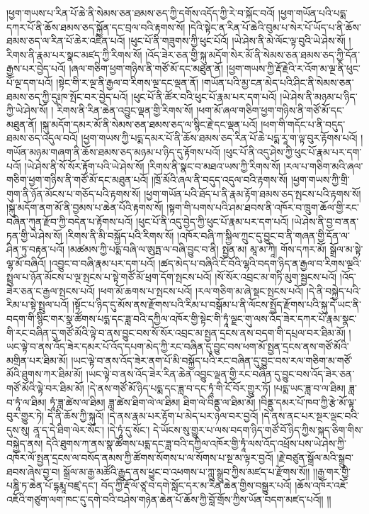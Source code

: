 །ཕྱག་གཡས་པ་རིན་པོ་ཆེ་ནི་སེམས་ཅན་ཐམས་ཅད་ཀྱི་དགོས་འདོད་ཀྱི་རེ་བ་སྐོང་བའོ། །ཕྱག་གཡོན་པའི་པདྨ་དཀར་པོ་ནི་ཆོས་ཐམས་ཅད་སྐྱོན་དང་བྲལ་བའི་རྟགས་སོ། །དེའི་སྟེང་ན་རིན་པོ་ཆེའི་བུམ་པ་སེར་པོ་ཡོད་པ་ནི་ཆོས་ཐམས་ཅད་ལ་རིན་པོ་ཆེར་འཛིན་པའོ། །ཕུང་པོ་ནི་གཟུགས་ཀྱི་ཕུང་པོའོ། །ཡེ་ཤེས་ནི་མེ་ལོང་ལྟ་བུའི་ཡེ་ཤེས་སོ། །རིགས་ནི་རྣམ་པར་སྣང་མཛད་ཀྱི་རིགས་སོ། །འོད་ཟེར་ཅན་གྱི་སྐུ་མདོག་སེར་མོ་ནི་སེམས་ཅན་ཐམས་ཅད་ཀྱི་དོན་རྒྱས་པར་བྱེད་པའོ། །ཞལ་གཅིག་ཕྱག་གཉིས་ནི་གཙོ་མོ་དང་མཐུན་ནོ། །ཕྱག་གཡས་ཀྱི་རྡོ་རྗེའི་ར་འོག་མ་ལྔ་ནི་ཕུང་པོ་ལྔ་དག་པའོ། །སྟེང་གི་ར་ལྔ་ནི་རྒྱལ་བ་རིགས་ལྔ་དང་ལྡན་ནོ། །གཡོན་པའི་མྱ་ངན་མེད་པའི་ཤིང་ནི་སེམས་ཅན་ཐམས་ཅད་ཀྱི་དུཿཁ་སྤོང་བར་བྱེད་པའོ། །ཕུང་པོ་ནི་ཚོར་བའི་ཕུང་པོ་རྣམ་པར་དག་པའོ། །ཡེ་ཤེས་ནི་མཉམ་པ་ཉིད་ཀྱི་ཡེ་ཤེས་སོ། །
རིགས་ནི་རིན་ཆེན་འབྱུང་ལྡན་གྱི་རིགས་སོ། །ཕག་མོ་ཞལ་གཅིག་ཕྱག་གཉིས་ནི་གཙོ་མོ་དང་མཐུན་ནོ། །སྐུ་མདོག་དམར་མོ་ནི་སེམས་ཅན་ཐམས་ཅད་ལ་སྙིང་རྗེ་དང་ལྡན་པའོ། །ཕག་གི་གདོང་པ་ནི་བདུད་ཐམས་ཅད་འདུལ་བའོ། །ཕྱག་གཡས་ཀྱི་པདྨ་དམར་པོ་ནི་ཆོས་ཐམས་ཅད་རིན་པོ་ཆེ་པདྨ་རཱ་ག་ལྟ་བུར་རྟོགས་པའོ། །གཡོན་མཉམ་གཞག་ནི་ཆོས་ཐམས་ཅད་མཉམ་པ་ཉིད་དུ་རྟོགས་པའོ། །ཕུང་པོ་ནི་འདུ་ཤེས་ཀྱི་ཕུང་པོ་རྣམ་པར་དག་པའོ། །ཡེ་ཤེས་ནི་སོ་སོར་རྟོག་པའི་ཡེ་ཤེས་སོ། །རིགས་ནི་སྣང་བ་མཐའ་ཡས་ཀྱི་རིགས་སོ། །རལ་པ་གཅིག་མའི་ཞལ་གཅིག་ཕྱག་གཉིས་ནི་གཙོ་མོ་དང་མཐུན་པའོ། །ཁྲོ་མོའི་ཞལ་ནི་བདུད་འདུལ་བའི་རྟགས་སོ། །ཕྱག་གཡས་ཀྱི་གྲི་གུག་ནི་ཉོན་མོངས་པ་གཅོད་པའི་རྟགས་སོ། །ཕྱག་གཡོན་པའི་ཐོད་པ་ནི་རྣམ་རྟོག་ཐམས་ཅད་སྤངས་པའི་རྟགས་སོ། །སྐུ་མདོག་ནག་མོ་ནི་བྱམས་པ་ཆེན་པོའི་རྟགས་སོ། །སྟག་གི་པགས་པའི་ཤམ་ཐབས་ནི་འཁོར་བ་ཁྲུག་ཆོལ་གྱི་རང་བཞིན་ཀུན་རྫོབ་ཀྱི་བདེན་པ་རྟོགས་པའོ། །ཕུང་པོ་ནི་འདུ་བྱེད་ཀྱི་ཕུང་པོ་རྣམ་པར་དག་པའོ། །ཡེ་ཤེས་ནི་བྱ་བ་ནན་ཏན་གྱི་ཡེ་ཤེས་སོ། །རིགས་ནི་མི་བསྐྱོད་པའི་རིགས་སོ། །འཁོར་བཞི་ཀ་སྐྱིལ་ཀྲུང་དུ་བྱུང་བ་ནི་གཞན་གྱི་དོན་ལ་ཤིན་ཏུ་བརྟན་པའོ། །མཚམས་ཀྱི་པདྨ་བཞི་ལ་ཨུཏྤ་ལ་བཞི་བྱུང་བ་ནི། སྤྱན་མ། མཱ་མ་ཀཱི། གོས་དཀར་མོ། སྒྲོལ་མ་སྟེ་ལྷ་མོ་བཞིའོ། །འབྱུང་བ་བཞི་རྣམ་པར་དག་པའོ། །ཚད་མེད་པ་བཞིའི་ངོ་བོའི་ལྷའི་བདག་ཉིད་ན་རྒྱལ་བ་རིགས་ལྔའི་སྤྲུལ་པ་ཉོན་མོངས་པ་ལྔ་སྤངས་པ་སྟེ་གཙོ་མོ་ཕྲག་དོག་སྤངས་པའོ། །སོ་སོར་འབྲང་མ་གཏི་མུག་སྦྱངས་པའོ། །འོད་ཟེར་ཅན་ང་རྒྱལ་སྤངས་པའོ། །ཕག་མོ་ཆགས་པ་སྤངས་པའོ། །རལ་གཅིག་མ་ཞེ་སྡང་སྤངས་པའོ། །དེ་ནི་བསྐྱེད་པའི་རིམ་པ་སྟེ་སྤྲུལ་པའོ། །སྟོང་པ་ཉིད་དུ་མོས་ནས་རྫོགས་པའི་རིམ་པ་བསྒོམ་པ་ནི་ལོངས་སྤྱོད་རྫོགས་པའི་སྐུ་དེ་ཡང་ནི་བདག་གི་སྙིང་གར་སྣ་ཚོགས་པདྨ་དང་ཟླ་བའི་དཀྱིལ་འཁོར་གྱི་སྟེང་གི་ཏཱཾ་ལྗང་གུ་ལས་འོད་ཟེར་དཀར་པོ་རྣམ་སྣང་གི་རང་བཞིན་དུ་གཙོ་མོའི་ལྟེ་བ་ནས་བྱུང་བས་སོ་སོར་འབྲང་མ་སྤྱན་དྲངས་ནས་བདག་གི་དཔྲལ་བར་ཐིམ་མོ། །ཡང་ལྟེ་བ་ནས་འོད་ཟེར་དམར་པོ་འོད་དཔག་མེད་ཀྱི་རང་བཞིན་དུ་བྱུང་བས་ཕག་མོ་སྤྱན་དྲངས་ནས་གཙོ་མོའི་མགྲིན་པར་ཐིམ་མོ། །ཡང་ལྟེ་བ་ནས་འོད་ཟེར་ནག་པོ་མི་བསྐྱོད་པའི་རང་བཞིན་དུ་བྱུང་བས་རལ་གཅིག་མ་གཙོ་མོའི་ཐུགས་ཀར་ཐིམ་མོ། །ཡང་ལྟེ་བ་ནས་འོད་ཟེར་རིན་ཆེན་འབྱུང་ལྡན་གྱི་རང་བཞིན་དུ་བྱུང་བས་འོད་ཟེར་ཅན་གཙོ་མོའི་ལྟེ་བར་ཐིམ་མོ། །དེ་ནས་གཙོ་མོ་ཉིད་པདྨ་དང་ཟླ་བ་དང་ཏཱཾ་གི་ངོ་བོར་གྱུར་ཏོ། །པདྨ་ཡང་ཟླ་བ་ལ་ཐིམ། ཟླ་བ་ཏཱཾ་ལ་ཐིམ། ཏཱཾ་ཟླ་ཚེས་ལ་ཐིམ། ཟླ་ཚེས་ཐིག་ལེ་ལ་ཐིམ། ཐིག་ལེ་བིནྡུ་ལ་ཐིམ་མོ། །བིནྡུ་དམར་པོ་ཁབ་ཀྱི་རྩེ་མོ་ལྟ་བུར་གྱུར་ཏེ། དེ་ནི་ཆོས་ཀྱི་སྐུའོ། །དེ་ནས་རྣམ་པར་རྟོག་པ་མེད་པར་ཉལ་བར་བྱའོ། །དེ་ནས་ནང་པར་སྔར་ལྡང་བའི་དུས་སུ། ནཱ་ད་དེ་ཐིག་ལེར་སོང་། །དེ་ཏཱཾ་དུ་སོང་། དེ་ཡོངས་སུ་གྱུར་པ་ལས་བདག་ཉིད་གཙོ་བོ་ཉིད་ཀྱིས་སྐད་ཅིག་གིས་བསྐྱེད་ནས། དེའི་ཐུགས་ཀ་ནས་སྣ་ཚོགས་པདྨ་དང་ཟླ་བའི་དཀྱིལ་འཁོར་གྱི་ཏཱཾ་ལས་འོད་འཕྲོས་པས་ཡེ་ཤེས་ཀྱི་འཁོར་ལོ་སྤྱན་དྲངས་ལ་བསོད་ནམས་ཀྱི་ཚོགས་སོགས་པ་ལ་སོགས་པ་སྔ་མ་ལྟར་བྱའོ། །རྗེ་བཙུན་སྒྲོལ་མའི་སྒྲུབ་ཐབས་ཞེས་བྱ་བ། སྒྲོལ་མ་རྒྱ་མཚོའི་རྒྱུད་ནས་ཕྱུང་བ་འཕགས་པ་ཀླུ་སྒྲུབ་ཀྱིས་མཛད་པ་རྫོགས་སོ།། །།རྒྱ་གར་གྱི་པཎྜི་ཏ་ཆེན་པོ་དྷརྨཱ་བཛྲ་དང་། བོད་ཀྱི་རྡོ་ལོ་ཙཱ་བ་དགེ་སློང་དར་མ་རིན་ཆེན་གྱིས་བསྒྱུར་པའོ། །ཆོས་འཁོར་འཇོ་འཇོའི་གཙུག་ལག་ཁང་དུ་དགེ་བའི་བཤེས་གཉེན་ཆེན་པོ་ཆོས་ཀྱི་བློ་གྲོས་ཀྱིས་ཡོན་བདག་མཛད་པའོ།། །།